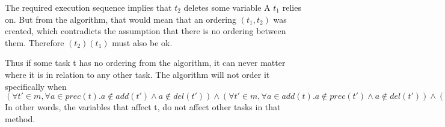 The required execution sequence implies that $t_2$ deletes some variable A $t_1$ relies on. But from the algorithm,
that would mean that an ordering $(t_1, t_2)$ was created, which contradicts the assumption that there is no ordering between them.
Therefore $(t_2)(t_1)$ must also be ok. 
 
Thus if some task t has no ordering from the algorithm, it can never matter where it is in relation to any other task.
The algorithm will not order it specifically when $(\forall t' \in m, \forall a \in prec(t). a \notin add(t') \land a \notin del(t'))
\land  (\forall t' \in m, \forall a \in add(t). a \notin prec(t') \land a \notin del(t')) 
\land  (\forall t' \in m, \forall a \in del(t). a \notin add(t') \land a \notin prec(t'))$
In other words, the variables that affect t, do not affect other tasks in that method.



